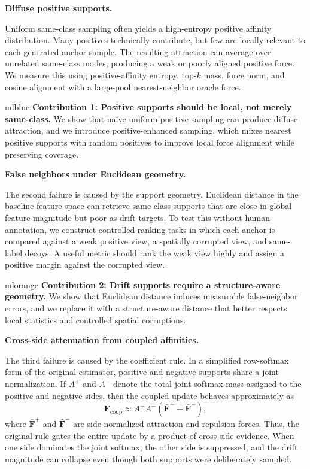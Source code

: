 \documentclass{article}
\newcommand{\introparagraph}[1]{%
  \par\noindent\textbf{#1.}\quad%
}
\newcommand{\F}{\mathbf{F}}
\newcommand{\Apos}{A^{+}}
\newcommand{\Aneg}{A^{-}}
\newcommand{\coup}{\mathrm{coup}}
\begin{document}
\introparagraph{Diffuse positive supports}
Uniform same-class sampling often yields a high-entropy positive affinity distribution.
Many positives technically contribute, but few are locally relevant to each generated anchor sample.
The resulting attraction can average over unrelated same-class modes, producing a weak or poorly aligned positive force.
We measure this using positive-affinity entropy, top-$k$ mass, force norm, and cosine alignment with a large-pool nearest-neighbor oracle force.

\begin{contributionbox}{mlblue}
\textbf{Contribution 1: Positive supports should be local, not merely same-class.}
We show that naïve uniform positive sampling can produce diffuse attraction, and we introduce positive-enhanced sampling, which mixes nearest positive supports with random positives to improve local force alignment while preserving coverage.
\end{contributionbox}

\introparagraph{False neighbors under Euclidean geometry}
The second failure is caused by the support geometry.
Euclidean distance in the baseline feature space can retrieve same-class supports that are close in global feature magnitude but poor as drift targets.
To test this without human annotation, we construct controlled ranking tasks in which each anchor is compared against a weak positive view, a spatially corrupted view, and same-label decoys.
A useful metric should rank the weak view highly and assign a positive margin against the corrupted view.

\begin{contributionbox}{mlorange}
\textbf{Contribution 2: Drift supports require a structure-aware geometry.}
We show that Euclidean distance induces measurable false-neighbor errors, and we replace it with a structure-aware distance that better respects local statistics and controlled spatial corruptions.
\end{contributionbox}

\introparagraph{Cross-side attenuation from coupled affinities}
The third failure is caused by the coefficient rule.
In a simplified row-softmax form of the original estimator, positive and negative supports share a joint normalization.
If $\Apos$ and $\Aneg$ denote the total joint-softmax mass assigned to the positive and negative sides, then the coupled update behaves approximately as
\begin{equation}
\F_{\coup}
\approx
\Apos \Aneg
\left(
\bar{\F}^{+}
+
\bar{\F}^{-}
\right),
\label{eq:intro_product_gate}
\end{equation}
where $\bar{\F}^{+}$ and $\bar{\F}^{-}$ are side-normalized attraction and repulsion forces.
Thus, the original rule gates the entire update by a product of cross-side evidence.
When one side dominates the joint softmax, the other side is suppressed, and the drift magnitude can collapse even though both supports were deliberately sampled.
\end{document}
